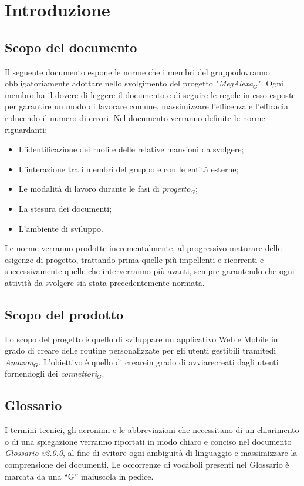 \chapter{Introduzione}\label{Intro}
\section{Scopo del documento}
Il seguente documento espone le norme che i membri del gruppodovranno obbligatoriamente adottare nello svolgimento del progetto "\textit{MegAlexa$_{G}$}".
Ogni membro ha il dovere di leggere il documento e di seguire le regole in esso esposte per garantire  un modo di lavorare comune, massimizzare l'efficenza e l'efficacia riducendo il numero di errori.
Nel documento verranno definite le  norme riguardanti:
\begin{itemize}
		\item L'identificazione dei ruoli e delle relative mansioni da svolgere;
		\item L'interazione tra i membri del gruppo e con le entità esterne;
		\item Le modalità di lavoro durante le fasi di \textit{progetto$_{G}$};
		\item La stesura dei documenti;
		\item L'ambiente di sviluppo.
\end{itemize}
Le norme verranno prodotte incrementalmente, al progressivo maturare delle esigenze di progetto, trattando prima quelle più impellenti e ricorrenti e successivamente quelle che interverranno più avanti, sempre garantendo che ogni attività da svolgere sia stata precedentemente normata.

\section{Scopo del prodotto}
Lo scopo del progetto è quello di sviluppare un applicativo Web e Mobile in grado di creare delle routine personalizzate per gli utenti gestibili tramitedi \textit{Amazon$_{G}$}. L'obiettivo è quello di crearein grado di avviarecreati dagli utenti fornendogli dei \textit{connettori$_{G}$}.

\section{Glossario}
I termini tecnici, gli acronimi e le abbreviazioni che necessitano di un chiarimento
o di una spiegazione verranno riportati in modo chiaro e conciso nel
documento \textit{Glossario v2.0.0}, al fine di evitare ogni ambiguità di linguaggio
e massimizzare la comprensione dei documenti. Le occorrenze di vocaboli presenti nel Glossario è marcata da una “G” maiuscola in pedice.

